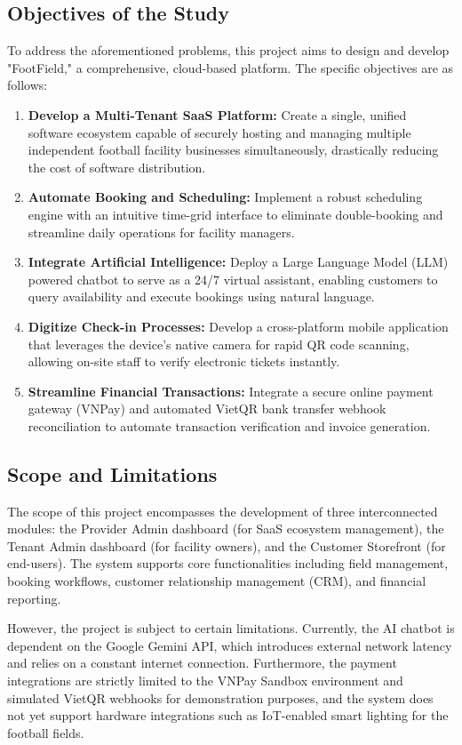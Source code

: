 \subsection{Objectives of the Study}
To address the aforementioned problems, this project aims to design and develop "FootField," a comprehensive, cloud-based platform. The specific objectives are as follows:
\begin{enumerate}
    \item \textbf{Develop a Multi-Tenant SaaS Platform:} Create a single, unified software ecosystem capable of securely hosting and managing multiple independent football facility businesses simultaneously, drastically reducing the cost of software distribution.
    \item \textbf{Automate Booking and Scheduling:} Implement a robust scheduling engine with an intuitive time-grid interface to eliminate double-booking and streamline daily operations for facility managers.
    \item \textbf{Integrate Artificial Intelligence:} Deploy a Large Language Model (LLM) powered chatbot to serve as a 24/7 virtual assistant, enabling customers to query availability and execute bookings using natural language.
    \item \textbf{Digitize Check-in Processes:} Develop a cross-platform mobile application that leverages the device's native camera for rapid QR code scanning, allowing on-site staff to verify electronic tickets instantly.
    \item \textbf{Streamline Financial Transactions:} Integrate a secure online payment gateway (VNPay) and automated VietQR bank transfer webhook reconciliation to automate transaction verification and invoice generation.
\end{enumerate}

\subsection{Scope and Limitations}
The scope of this project encompasses the development of three interconnected modules: the Provider Admin dashboard (for SaaS ecosystem management), the Tenant Admin dashboard (for facility owners), and the Customer Storefront (for end-users). The system supports core functionalities including field management, booking workflows, customer relationship management (CRM), and financial reporting.

However, the project is subject to certain limitations. Currently, the AI chatbot is dependent on the Google Gemini API, which introduces external network latency and relies on a constant internet connection. Furthermore, the payment integrations are strictly limited to the VNPay Sandbox environment and simulated VietQR webhooks for demonstration purposes, and the system does not yet support hardware integrations such as IoT-enabled smart lighting for the football fields.

